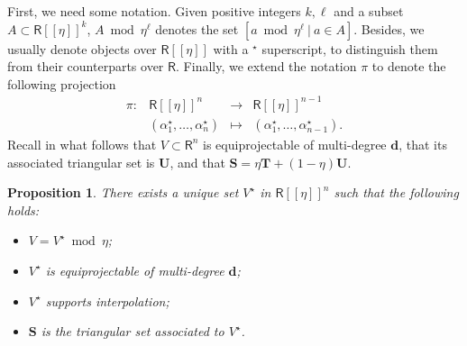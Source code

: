 \documentclass[amsthm]{elsart}
\def\d {\ensuremath{\mathbf{d}}}
\def\S {\ensuremath{\mathbf{S}}}
\def\T {\ensuremath{\mathbf{T}}}
\def\U {\ensuremath{\mathbf{U}}}
\def\rng {\ensuremath{\mathsf{R}}}
\theoremstyle{plain}
\newtheorem{Proposition}{Proposition}
\begin{document}
First, we need some notation.  Given positive integers $k,\ell$ and a
subset $A \subset \rng[[\eta]]^k$, $A \bmod \eta^\ell$ denotes the set
$[a \bmod \eta^\ell \ | \ a\in A]$. Besides, we usually denote objects
over $\rng[[\eta]]$ with a ${}^\star$ superscript, to distinguish them
from their counterparts over $\rng$. Finally, we extend the
notation $\pi$ to denote the following projection
$$\begin{array}{rccc}
  \pi: & \rng[[\eta]]^n & \to & \rng[[\eta]]^{n-1} \\
  & (\alpha^\star_1,\dots,\alpha^\star_n) & \mapsto & (\alpha^\star_1,\dots,\alpha^\star_{n-1}).
\end{array}$$
Recall in what follows that $V\subset \rng^n$ is equiprojectable of multi-degree $\d$,
that its associated triangular set is $\U$, and that $\S=\eta \T + (1-\eta) \U$.
\begin{Proposition}\label{Prop:lift}
  There exists a unique set ${V^\star}$ in $\rng[[\eta]]^n$ such
  that the following holds:

\smallskip

  \begin{itemize}
  \item $V={V^\star} \bmod \eta$;

\smallskip

  \item ${V^\star}$ is equiprojectable of multi-degree $\d$;

\smallskip

  \item ${V^\star}$ supports interpolation;

\smallskip

  \item $\S$ is the triangular set associated to ${V^\star}$.
  \end{itemize} 
\end{Proposition}
\end{document}
